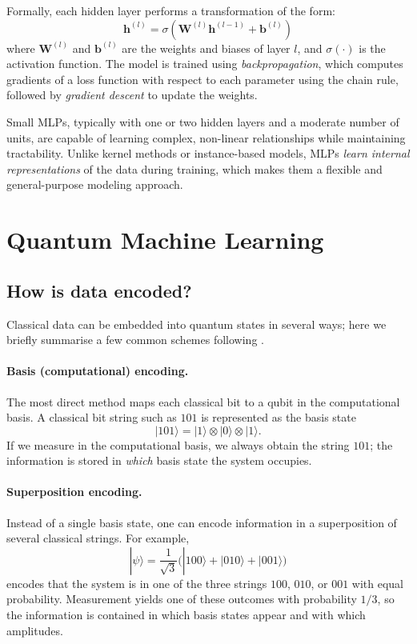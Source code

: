 \documentclass[12pt,a4paper,openany]{report}
\let\textcite\citet
\begin{document}
Formally, each hidden layer performs a transformation of the form:
\[
\mathbf{h}^{(l)} = \sigma(\mathbf{W}^{(l)} \mathbf{h}^{(l-1)} + \mathbf{b}^{(l)})
\]
where $\mathbf{W}^{(l)}$ and $\mathbf{b}^{(l)}$ are the weights and biases of layer $l$, and $\sigma(\cdot)$ is the activation function. The model is trained using \textit{backpropagation}, which computes gradients of a loss function with respect to each parameter using the chain rule, followed by \textit{gradient descent} to update the weights.

Small MLPs, typically with one or two hidden layers and a moderate number of units, are capable of learning complex, non-linear relationships while maintaining tractability. Unlike kernel methods or instance-based models, MLPs \textit{learn internal representations} of the data during training, which makes them a flexible and general-purpose modeling approach.


\section{Quantum Machine Learning}
\label{sec:qml}

\subsection{How is data encoded?}

Classical data can be embedded into quantum states in several ways; here we briefly
summarise a few common schemes following \textcite{rath2023quantum}.

\paragraph{Basis (computational) encoding.}
The most direct method maps each classical bit to a qubit in the computational basis.
A classical bit string such as $101$ is represented as the basis state
\[
    |101\rangle = |1\rangle \otimes |0\rangle \otimes |1\rangle .
\]
If we measure in the computational basis, we always obtain the string $101$; the
information is stored in \emph{which} basis state the system occupies.

\paragraph{Superposition encoding.}
Instead of a single basis state, one can encode information in a superposition of
several classical strings. For example,
\[
    |\psi\rangle = \frac{1}{\sqrt{3}}\bigl(|100\rangle + |010\rangle + |001\rangle\bigr)
\]
encodes that the system is in one of the three strings $100$, $010$, or $001$
with equal probability. Measurement yields one of these outcomes with probability
$1/3$, so the information is contained in which basis states appear and with which
amplitudes.
\end{document}
